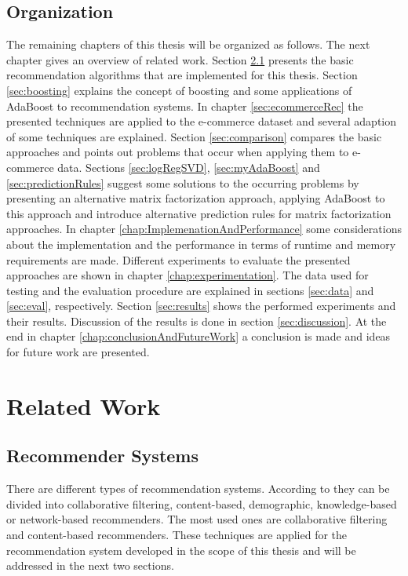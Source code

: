 \documentclass[10pt]{reportMaster}
\begin{document}
\section{Organization}
The remaining chapters of this thesis will be organized as follows.
The next chapter gives an overview of related work.
Section \ref{sec:recommenderSystems} presents the basic recommendation algorithms that are implemented for this thesis.
Section \ref{sec:boosting} explains the concept of boosting and some applications of AdaBoost to recommendation systems.
In chapter \ref{sec:ecommerceRec} the presented techniques are applied to the e-commerce dataset and several adaption of some techniques are explained.
Section \ref{sec:comparison} compares the basic approaches and points out problems that occur when applying them to e-commerce data.
Sections \ref{sec:logRegSVD}, \ref{sec:myAdaBoost} and \ref{sec:predictionRules} suggest some solutions to the occurring problems by presenting an alternative matrix factorization approach, applying AdaBoost to this approach and introduce alternative prediction rules for matrix factorization approaches. 
In chapter \ref{chap:ImplemenationAndPerformance} some considerations about the implementation and the performance in terms of runtime and memory requirements are made.
Different experiments to evaluate the presented approaches are shown in chapter \ref{chap:experimentation}.
The data used for testing and the evaluation procedure are explained in sections \ref{sec:data} and \ref{sec:eval}, respectively.
Section \ref{sec:results} shows the performed experiments and their results.
Discussion of the results is done in section \ref{sec:discussion}.
At the end in chapter \ref{chap:conclusionAndFutureWork} a conclusion is made and ideas for future work are presented.






\chapter{Related Work}
\label{sec:relatedWork}

\section{Recommender Systems}
\label{sec:recommenderSystems}
There are different types of recommendation systems.
According to \cite{hybridSurvey} they can be divided into collaborative filtering, content-based, demographic, knowledge-based or network-based recommenders.
The most used ones are collaborative filtering and content-based recommenders.
These techniques are applied for the recommendation system developed in the scope of this thesis and will be addressed in the next two sections.
\end{document}
